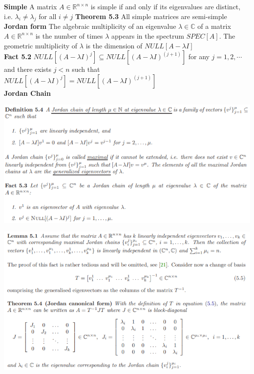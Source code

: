 \documentclass[10pt,landscape]{article}
\newenvironment{Figure}
{\par\medskip\noindent\minipage{\linewidth}}
{\endminipage\par\medskip}
\begin{document}
\begin{multicols*}{4}
\textbf{Simple} A matrix $A \in \mathbb{R}^{n \times n}$ is simple if and only if its eigenvalues are distinct, i.e. $\lambda_i \neq \lambda_j$ for all $i \neq j$
\textbf{Theorem 5.3} All simple matrices are semi-simple\\

\textbf{Jordan form} The algebraic multiplicity of an eigenvalue $\lambda \in \mathbb{C}$ of a matrix $A \in \mathbb{R}^{n \times n}$ is the number of times $\lambda$ appears in the spectrum $SPEC[A]$. The geometric multiplicity of $\lambda$ is the dimension of $NULL[A - \lambda I]$\\

\textbf{Fact 5.2} $NULL[(A - \lambda I)^j] \subseteq NULL[(A - \lambda I)^(j+1)]$ for any $j = 1, 2, \cdots$ and there exists $j < n$ such that 
$NULL[(A - \lambda I)^j] = NULL[(A - \lambda I)^(j+1)]$ \\



\textbf{Jordan Chain}
\begin{Figure}
	\centering
	\includegraphics[width=\linewidth]{pictures/Fac5_4.png}
\end{Figure}

\begin{Figure}
	\centering
	\includegraphics[width=\linewidth]{pictures/lem5_1.png}
\end{Figure}



\end{multicols*}
\end{document}
